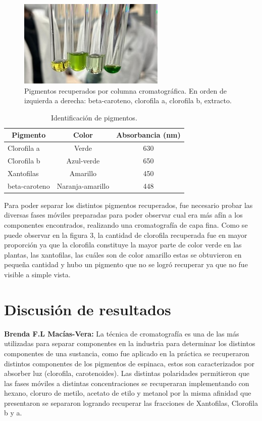 \documentclass{ITESO-Report}
\newcommand{\toprow}[1]{\multicolumn{1}{c}{\textbf{#1}}}
\begin{document}
\begin{figure}[htpb]
    \centering
    \includegraphics[width=0.5\columnwidth]{figuras/pigments.jpg}
    \caption{Pigmentos recuperados por columna cromatográfica. En orden de izquierda a derecha: beta-caroteno, clorofila a, clorofila b, extracto.}
    \label{fig:pigments}
\end{figure}

\begin{table}[htpb]
    \centering
    \caption{Identificación de pigmentos.}
    \begin{tabular}{lcc}
        \toprule
        \toprow{Pigmento} & \toprow{Color} & \toprow{Absorbancia (nm)}\\ \hline
        Clorofila a & Verde & 630\\
        Clorofila b & Azul-verde & 650\\
        Xantofilas & Amarillo & 450\\
        beta-caroteno & Naranja-amarillo & 448 \\
        \bottomrule
    \end{tabular}
    \label{tab:pigment}
\end{table}

Para poder separar los distintos pigmentos recuperados, fue necesario probar las diversas fases móviles preparadas para poder observar cual era más afín a los componentes encontrados, realizando una cromatografía de capa fina. Como se puede observar en la figura 3, la cantidad de clorofila recuperada fue en mayor proporción ya que la clorofila constituye la mayor parte de color verde en las plantas, las xantofilas, las cuáles son de color amarillo estas se obtuvieron en pequeña cantidad y hubo un pigmento que no se logró recuperar ya que no fue visible a simple vista.

\section{Discusión de resultados}

{\color{darkgray}\bfseries Brenda F.L Macías-Vera:}\hspace{1em}
La técnica de cromatografía es una de las más utilizadas para separar componentes en la industria para determinar los distintos componentes de una sustancia, como fue aplicado en la práctica se recuperaron distintos componentes de los pigmentos de espinaca, estos son caracterizados por absorber luz (clorofila, carotenoides). Las distintas polaridades permitieron que las fases móviles a distintas concentraciones se recuperaran implementando con hexano, cloruro de metilo, acetato de etilo y metanol por la misma afinidad que presentaron se separaron logrando recuperar las fracciones de Xantofilas, Clorofila b y a.
\end{document}
